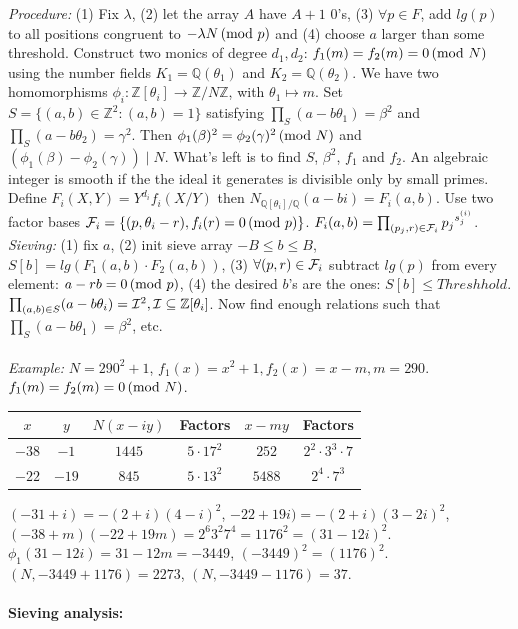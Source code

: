 \emph{Procedure:}
(1) Fix $\lambda$, (2) let the array $A$ have $A+1$ $0$'s, (3) $\forall p \in F$,  add
$lg(p)$ to all positions congruent to $- \lambda N \thinspace \textnormal{(mod } p \textnormal{)}$ and 
(4) choose $a$ larger than some threshold.
Construct two monics of degree $d_1, d_2$: $f_1(m) = f_2(m)= 0 \thinspace \textnormal{(mod } N \textnormal{)}$ using the
number fields 
$K_1= {\mathbb Q}(\theta_1)$ and
$K_2= {\mathbb Q}(\theta_2)$.  
We have two homomorphisms 
$\phi_i: {\mathbb Z}[\theta_i] \rightarrow {\mathbb Z}/N{\mathbb Z}$, 
with $\theta_1 \mapsto m$.  Set $S= \{ (a,b) \in {\mathbb Z}^2: (a,b)=1\}$ satisfying
$\prod_S (a-b \theta_1) = \beta^2$ and $\prod_S (a-b \theta_2) = \gamma^2$.  Then
$\phi_1(\beta)^2= \phi_2(\gamma)^2 \thinspace \textnormal{(mod } N \textnormal{)}$ and $(\phi_1(\beta)-\phi_2(\gamma)) \mid N$.
What's left is to find $S$, $\beta^2$, $f_1$ and $f_2$.  An algebraic integer is smooth if the
the ideal it generates is divisible only by small primes.  
Define $F_i(X,Y)= Y^{d_i}f_i(X/Y)$ then 
$N_{{\mathbb Q}[\theta_i]/{\mathbb Q}}(a-bi)= F_i(a,b)$.
Use two factor bases ${\cal F}_i= \{ (p,\theta_i-r), f_i(r)= 0 \thinspace \textnormal{(mod } p \textnormal{)} \}$.
$F_i(a,b)= \prod_{(p_j,r) \in {\cal F}_i} {p_j}^{s_j^{(i)}}$.  
\emph{Sieving:}
(1) fix $a$, (2) init sieve array $-B \le b \le B$, $S[b]= lg(F_1(a,b) \cdot F_2(a,b))$,
(3) $\forall (p,r) \in {\cal F}_i$ subtract $lg(p)$ from every element:
$a-rb=0 \thinspace \textnormal{(mod } p \textnormal{)}$, (4) the desired $b$'s are the ones: $S[b] \le Threshhold$.
$\prod_{(a,b) \in S} (a-b \theta_i)= {\cal I}^2, {\cal I} \subseteq {\mathbb Z}[\theta_i]$.  
Now find enough relations such that $\prod_S (a-b \theta_1)= \beta^2$, etc.
\\
\\
\emph{Example:} $N=290^2+1$, $f_1(x)= x^2+1, f_2(x)=x-m, m=290$.  $f_1(m)=f_2(m)=0 \thinspace \textnormal{(mod } N \textnormal{)}$.
\begin{center}
\begin{tabular} {|c|c|c|c|c|c|}
\hline
$x$ & $y$ & $N(x-iy)$ & Factors & $x-my$ & Factors\\
\hline
$-38$ & $-1$ & $1445$ & $5 \cdot 17^2$ & $252$ & $2^2 \cdot 3^3 \cdot 7$\\
$-22$ & $-19$ & $845$ & $5 \cdot 13^2$ & $5488$ & $2^4 \cdot 7^3$\\
\hline
\end{tabular}
\end{center}
$(-31+i)= -(2+i)(4-i)^2$,
$-22 + 19i)= -(2+i) (3-2i)^2$,
$(-38+m)(-22+19m)=2^6 3^2 7^4= 1176^2=(31-12i)^2$.
$\phi_1(31-12i)=31-12m= -3449$, $(-3449)^2=(1176)^2$.
$(N, -3449+1176)= 2273$, $(N, -3449-1176)=37$.
\\
\\
{\bf Sieving analysis:}
